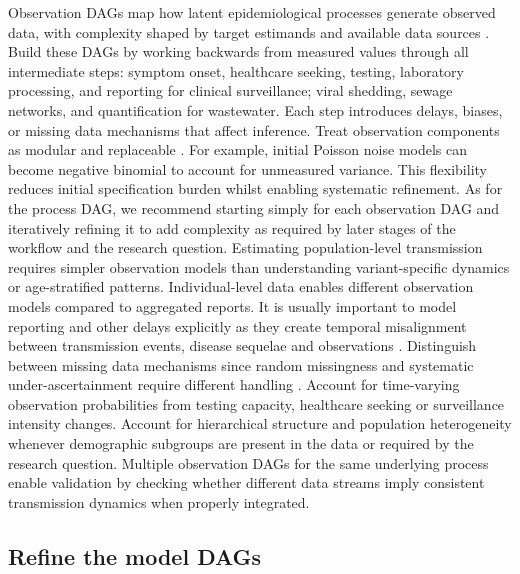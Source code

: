 \documentclass{article}
\begin{document}
Observation DAGs map how latent epidemiological processes generate observed data, with complexity shaped by target estimands and available data sources \citep{deangelis2018analysing}.
Build these DAGs by working backwards from measured values through all intermediate steps: symptom onset, healthcare seeking, testing, laboratory processing, and reporting for clinical surveillance; viral shedding, sewage networks, and quantification for wastewater.
Each step introduces delays, biases, or missing data mechanisms that affect inference.
Treat observation components as modular and replaceable \citep{gelman2020bayesian}. For example, initial Poisson noise models can become negative binomial to account for unmeasured variance.
This flexibility reduces initial specification burden whilst enabling systematic refinement.
As for the process DAG, we recommend starting simply for each observation DAG and iteratively refining it to add complexity as required by later stages of the workflow and the research question.
Estimating population-level transmission requires simpler observation models than understanding variant-specific dynamics or age-stratified patterns.
Individual-level data enables different observation models compared to aggregated reports.
It is usually important to model reporting and other delays explicitly as they create temporal misalignment between transmission events, disease sequelae and observations \citep{seaman2022nowcasting}.
Distinguish between missing data mechanisms since random missingness and systematic under-ascertainment require different handling \citep{sherratt2021exploring}.
Account for time-varying observation probabilities from testing capacity, healthcare seeking or surveillance intensity changes.
Account for hierarchical structure and population heterogeneity whenever demographic subgroups are present in the data or required by the research question.
Multiple observation DAGs for the same underlying process enable validation by checking whether different data streams imply consistent transmission dynamics when properly integrated.

\subsection{Refine the model DAGs}
\end{document}
